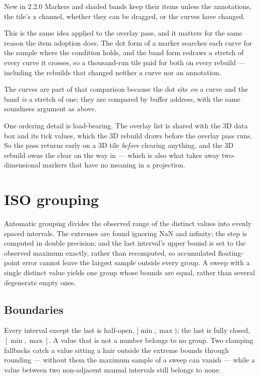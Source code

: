 \documentclass[11pt,a4paper,oneside]{report}
\newcommand{\appver}{2.2.0}
\begin{document}
\begin{aoenew}{New in \appver}
Markers and shaded bands keep their items unless the annotations, the tile's x
channel, whether they can be dragged, or the curves have changed.
\end{aoenew}

This is the same idea applied to the overlay pass, and it matters for the same
reason the item adoption does. The dot form of a marker searches each curve for
the sample where the condition holds, and the band form redraws a stretch of
every curve it crosses, so a thousand-run tile paid for both on every rebuild
--- including the rebuilds that changed neither a curve nor an annotation.

The curves are part of that comparison because the dot sits \emph{on} a curve
and the band \emph{is} a stretch of one; they are compared by buffer address,
with the same soundness argument as above.

One ordering detail is load-bearing. The overlay list is shared with the 3D data
box and its tick values, which the 3D rebuild draws before the overlay pass
runs. So the pass returns early on a 3D tile \emph{before} clearing anything,
and the 3D rebuild owns the clear on the way in --- which is also what takes
away two-dimensional markers that have no meaning in a projection.

\section{ISO grouping}

Automatic grouping divides the observed range of the distinct values into evenly
spaced intervals. The extremes are found ignoring NaN and infinity; the step is
computed in double precision; and the last interval's upper bound is set to the
observed maximum exactly, rather than recomputed, so accumulated floating-point
error cannot leave the largest sample outside every group. A sweep with a single
distinct value yields one group whose bounds are equal, rather than several
degenerate empty ones.

\subsection{Boundaries}

Every interval except the last is half-open, $[\min, \max)$; the last is fully
closed, $[\min, \max]$. A value that is not a number belongs to no group. Two
clamping fallbacks catch a value sitting a hair outside the extreme bounds
through rounding --- without them the maximum sample of a sweep can vanish ---
while a value between two non-adjacent manual intervals still belongs to none.
\end{document}
